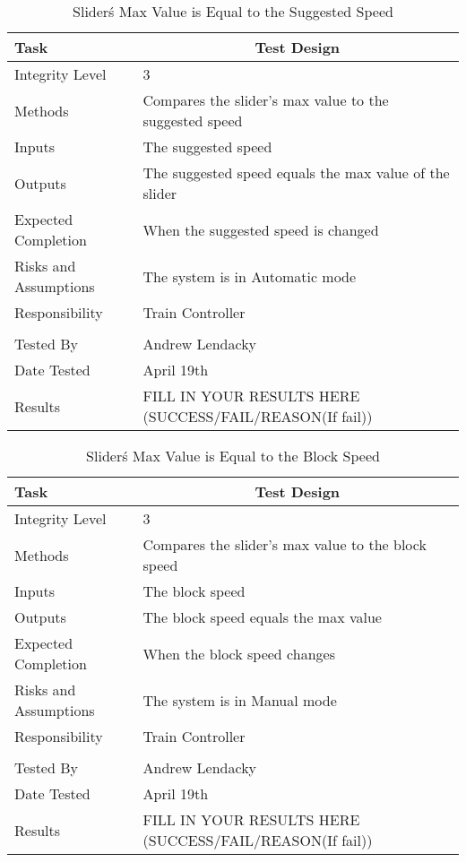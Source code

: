\documentclass[]{article}
\begin{document}
\begin{table}[H]
	\centering
	\caption{Slider\'s Max Value is Equal to the Suggested Speed}
	\begin{tabular}{|l|l|}
		\hline
		Task & \multicolumn{1}{c|}{Test Design} \\ \hline
		Integrity Level & 3 \\ \hline
		Methods & Compares the slider's max value to the suggested speed\\ \hline
		Inputs & The suggested speed\\ \hline
		Outputs & The suggested speed equals the max value of the slider \\ \hline
		Expected Completion & When the suggested speed is changed\\ \hline
		Risks and Assumptions & The system is in Automatic mode \\ \hline
		Responsibility &  Train Controller\\ \hline
			\\ \hline
		Tested By   &  Andrew Lendacky\\	\hline
		Date Tested & \parbox[t]{10cm}{April 19th}\\ \hline
		Results & FILL IN YOUR RESULTS HERE (SUCCESS/FAIL/REASON(If fail))\\ \hline
	\end{tabular}
\end{table}

\begin{table}[H]
	\centering
	\caption{Slider\'s Max Value is Equal to the Block Speed}
	\begin{tabular}{|l|l|}
		\hline
		Task & \multicolumn{1}{c|}{Test Design} \\ \hline
		Integrity Level & 3 \\ \hline
		Methods & Compares the slider's max value to the block speed\\ \hline
		Inputs & The block speed\\ \hline
		Outputs & The block speed equals the max value \\ \hline
		Expected Completion & When the block speed changes\\ \hline
		Risks and Assumptions & The system is in Manual mode \\ \hline
		Responsibility &  Train Controller\\ \hline
			\\ \hline
		Tested By   &  Andrew Lendacky\\	\hline
		Date Tested & \parbox[t]{10cm}{April 19th}\\ \hline
		Results & FILL IN YOUR RESULTS HERE (SUCCESS/FAIL/REASON(If fail))\\ \hline
	\end{tabular}
\end{table}
\end{document}
